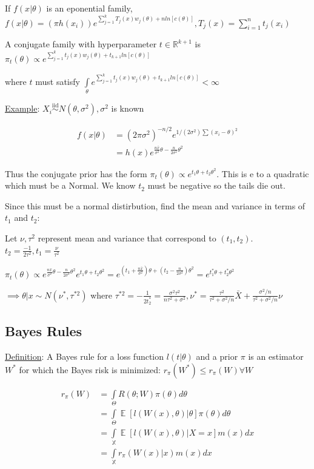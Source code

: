 \documentclass{article}
\DeclareMathOperator{\EX}{\mathbb{E}} %
\newcommand{\real}{\mathbb{R}} %
\let\Oldint=\int
\let\Oldsum=\sum
\renewcommand{\int}{\Oldint\limits}
\renewcommand{\sum}{\Oldsum\limits}
\newcommand{\iiddist}{\overset{\mathrm{iid}}{\sim}}
\begin{document}
If $f(x|\theta)$ is an eponential family, $f(x|\theta) = (\pi h(x_i))e^{\sum_{j=1}^k T_j(x)w_j(\theta) + n ln[c(\theta)]}, T_j(x) = \sum_{i=1}^n t_j(x_i)$

A conjugate family with hyperparameter $t \in \real^{k+1}$ is $\pi_t(\theta) \propto e^{\sum_{j=1}^k t_j(x)w_j(\theta) + t_{k+1} ln[c(\theta)]}$ 

where $t$ must satisfy $\int_\theta e^{\sum_{j=1}^k t_j(x)w_j(\theta) + t_{k+1} ln[c(\theta)]} < \infty$


\underline{Example}:
$X_i \iiddist N(\theta, \sigma^2), \sigma^2$ is known


$$
\begin{aligned}
f(x|\theta) 
&= (2\pi \sigma^2)^{-n/2} e^{1/(2\sigma^2)\sum(x_i - \theta)^2} \\ 
&= h(x) e^{\frac{n\bar{x}}{\sigma^2}\theta - \frac{n}{2\sigma^2}\theta^2}
\end{aligned}
$$

Thus the conjugate prior has the form $\pi_t(\theta) \propto e^{t_1 \theta + t_2\theta^2}$. This is e to a quadratic which must be a Normal. We know $t_2$ must be negative so the tails die out. 

Since this must be a normal distirbution, find the mean and variance in terms of $t_1$ and $t_2$:

Let $\nu, \tau^2$ represent mean and variance that correspond to $(t_1, t_2)$. $t_2 = \frac{-1}{2\tau^2}, t_1 = \frac{\nu}{\tau^2}$

$\pi_t(\theta) \propto e^{\frac{n\bar{x}}{\sigma^2}\theta - \frac{n}{2\sigma^2}\theta^2} e^{t_1 \theta + t_2\theta^2} = e^{(t_1 + \frac{n\bar{x}}{\sigma^2})\theta + (t_2 - \frac{n}{2\sigma^2})\theta^2} = e^{t_1^*\theta + t_2^*\theta^2}$

$\implies \theta|x \sim N(\nu^*, \tau^{*2})$ where $\tau^{*2} = -\frac{1}{2t_2^*} = \frac{\sigma^2\tau^2}{n \tau^2 + \sigma^2}, \nu^* = \frac{\tau^2}{\tau^2 + \sigma^2/n}\bar{X} + \frac{\sigma^2/n}{\tau^2 + \sigma^2/n}\nu$


\subsection{Bayes Rules}
\underline{Definition}: A Bayes rule for a loss function $l(t|\theta)$ and a prior $\pi$ is an estimator $W^*$ for which the Bayes risk is minimized: $r_{\pi}(W^*) \le r_{\pi}(W) \forall W$

$$
\begin{aligned}
r_{\pi}(W) 
&= \int_{\Theta} R(\theta;W)\pi(\theta)d\theta \\
&= \int_{\Theta} \EX[l(W(x), \theta)|\theta]\pi(\theta)d\theta \\
&= \int_\mathbb{X} \EX[l(W(x), \theta)|X=x]m(x)dx \\
&= \int_\mathbb{X} r_{\pi}(W(x)|x)m(x)dx
\end{aligned}
$$
\end{document}
